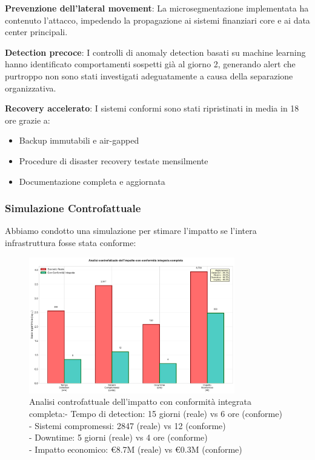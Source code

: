 \textbf{Prevenzione dell'lateral movement}: La microsegmentazione implementata ha contenuto l'attacco, impedendo la propagazione ai sistemi finanziari core e ai data center principali.

\textbf{Detection precoce}: I controlli di anomaly detection basati su machine learning hanno identificato comportamenti sospetti già al giorno 2, generando alert che purtroppo non sono stati investigati adeguatamente a causa della separazione organizzativa.

\textbf{Recovery accelerato}: I sistemi conformi sono stati ripristinati in media in 18 ore grazie a:
\begin{itemize}
    \item Backup immutabili e air-gapped
    \item Procedure di disaster recovery testate mensilmente  
    \item Documentazione completa e aggiornata
\end{itemize}

\subsubsection{Simulazione Controfattuale}

Abbiamo condotto una simulazione per stimare l'impatto se l'intera infrastruttura fosse stata conforme:

\begin{figure}[h]

\centering

\includegraphics[width=0.8\textwidth]{thesis_figures/cap4/figura_4_5_controfattuale.pdf}

\caption [Analisi controfattuale dell'impatto con conformità integrata completa]{Analisi controfattuale dell'impatto con conformità integrata completa:- Tempo di detection: 15 giorni (reale) vs 6 ore (conforme)\\
- Sistemi compromessi: 2847 (reale) vs 12 (conforme)\\
- Downtime: 5 giorni (reale) vs 4 ore (conforme)\\
- Impatto economico: €8.7M (reale) vs €0.3M (conforme)}
\label{fig:controfattuale}
\end{figure}

